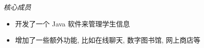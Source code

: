 
\textit{核心成员}
\begin{itemize}
  \item 开发了一个 Java 软件来管理学生信息
  \item 增加了一些额外功能, 比如在线聊天, 数字图书馆, 网上商店等
\end{itemize}
